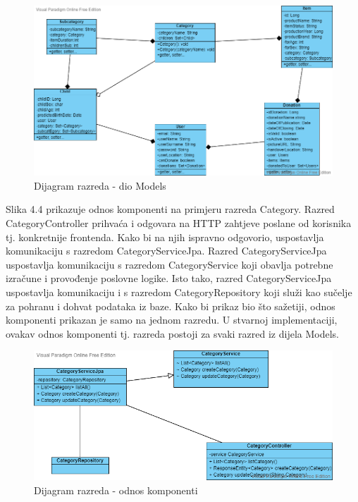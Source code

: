 			\begin{figure}[H]
				\includegraphics[width=\textwidth,height=0.35\textheight]{dijagrami/Modeli.png}
				\centering
				\caption{Dijagram razreda - dio Models}
				\label{fig:Models}
			\end{figure}
			\eject
			Slika 4.4 prikazuje odnos komponenti na primjeru razreda Category. Razred CategoryController prihvaća i odgovara na HTTP zahtjeve poslane od korisnika tj. konkretnije frontenda. Kako bi na njih ispravno odgovorio, uspostavlja komunikaciju s razredom CategoryServiceJpa.
			Razred CategoryServiceJpa uspostavlja komunikaciju s razredom CategoryService koji obavlja potrebne izračune i provođenje poslovne logike. Isto tako, razred CategoryServiceJpa uspostavlja komunikaciju i s razredom CategoryRepository koji služi kao sučelje za pohranu i dohvat podataka iz baze.
			Kako bi prikaz bio što sažetiji, odnos komponenti prikazan je samo na jednom razredu. U stvarnoj implementaciji, ovakav odnos komponenti tj. razreda postoji za svaki razred iz dijela Models.\\[10pt]

			\begin{figure}[H]
				\includegraphics[width=\textwidth,height=0.35\textheight]{dijagrami/OdnosKomponenti.png}
				\centering
				\caption{Dijagram razreda - odnos komponenti}
				\label{fig:OdnosKomponenti}
			\end{figure}

